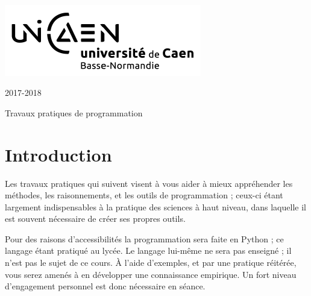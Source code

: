 \documentclass[a4paper,11pt]{article}
\begin{document}
%
\thispagestyle{empty}
\renewcommand{\headrulewidth}{0.0pt}
%

\setlength{\columnsep}{30pt}
\setlength{\columnseprule}{1pt}
\noindent
\begin{minipage}[t]{0.35\textwidth}
~\\[-2ex]
\includegraphics[scale=0.7]{unicaen_logo_rvb_noir_V1}

\end{minipage}
\begin{minipage}[t]{0.50\textwidth}
\end{minipage}
\begin{minipage}[t]{0.12\textwidth}
\flushleft
{
\footnotesize{2017-2018}}
\end{minipage}

\vspace{0.5cm}

\centerline{\sc\Large Travaux pratiques de programmation}
{\let\clearpage\relax \section*{Introduction}}
Les travaux pratiques qui suivent visent à vous aider à mieux appréhender 
les méthodes, les raisonnements, et les outils de programmation ;
ceux-ci étant largement indispensables à la pratique des sciences à
haut niveau, dans laquelle il est souvent nécessaire
de créer ses propres outils. 

Pour des raisons d'accessibilités la programmation sera faite en Python ;
ce langage étant pratiqué au lycée. Le langage lui-même ne sera pas enseigné ; 
il n'est pas le sujet de ce cours.
À l'aide d'exemples, et par une pratique réitérée, 
vous serez amenés à en développer une connaissance empirique. 
Un fort niveau d'engagement personnel est donc nécessaire en séance. 
\end{document}
